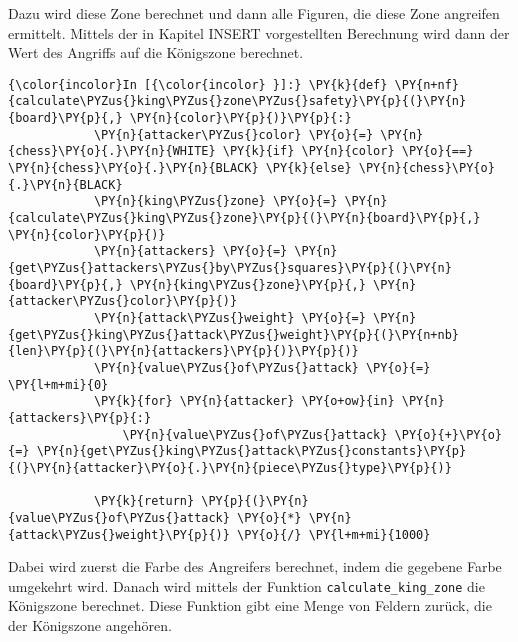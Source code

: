 Dazu wird diese Zone berechnet und dann alle Figuren, die diese Zone
angreifen ermittelt. Mittels der in Kapitel INSERT vorgestellten
Berechnung wird dann der Wert des Angriffs auf die Königszone berechnet.

    \begin{Verbatim}[commandchars=\\\{\}]
{\color{incolor}In [{\color{incolor} }]:} \PY{k}{def} \PY{n+nf}{calculate\PYZus{}king\PYZus{}zone\PYZus{}safety}\PY{p}{(}\PY{n}{board}\PY{p}{,} \PY{n}{color}\PY{p}{)}\PY{p}{:}
            \PY{n}{attacker\PYZus{}color} \PY{o}{=} \PY{n}{chess}\PY{o}{.}\PY{n}{WHITE} \PY{k}{if} \PY{n}{color} \PY{o}{==} \PY{n}{chess}\PY{o}{.}\PY{n}{BLACK} \PY{k}{else} \PY{n}{chess}\PY{o}{.}\PY{n}{BLACK}
            \PY{n}{king\PYZus{}zone} \PY{o}{=} \PY{n}{calculate\PYZus{}king\PYZus{}zone}\PY{p}{(}\PY{n}{board}\PY{p}{,} \PY{n}{color}\PY{p}{)}
            \PY{n}{attackers} \PY{o}{=} \PY{n}{get\PYZus{}attackers\PYZus{}by\PYZus{}squares}\PY{p}{(}\PY{n}{board}\PY{p}{,} \PY{n}{king\PYZus{}zone}\PY{p}{,} \PY{n}{attacker\PYZus{}color}\PY{p}{)}
            \PY{n}{attack\PYZus{}weight} \PY{o}{=} \PY{n}{get\PYZus{}king\PYZus{}attack\PYZus{}weight}\PY{p}{(}\PY{n+nb}{len}\PY{p}{(}\PY{n}{attackers}\PY{p}{)}\PY{p}{)}
            \PY{n}{value\PYZus{}of\PYZus{}attack} \PY{o}{=} \PY{l+m+mi}{0}
            \PY{k}{for} \PY{n}{attacker} \PY{o+ow}{in} \PY{n}{attackers}\PY{p}{:}
                \PY{n}{value\PYZus{}of\PYZus{}attack} \PY{o}{+}\PY{o}{=} \PY{n}{get\PYZus{}king\PYZus{}attack\PYZus{}constants}\PY{p}{(}\PY{n}{attacker}\PY{o}{.}\PY{n}{piece\PYZus{}type}\PY{p}{)}
            
            \PY{k}{return} \PY{p}{(}\PY{n}{value\PYZus{}of\PYZus{}attack} \PY{o}{*} \PY{n}{attack\PYZus{}weight}\PY{p}{)} \PY{o}{/} \PY{l+m+mi}{1000}
\end{Verbatim}

    Dabei wird zuerst die Farbe des Angreifers berechnet, indem die gegebene
Farbe umgekehrt wird. Danach wird mittels der Funktion
\texttt{calculate\_king\_zone} die Königszone berechnet. Diese Funktion
gibt eine Menge von Feldern zurück, die der Königszone angehören.

